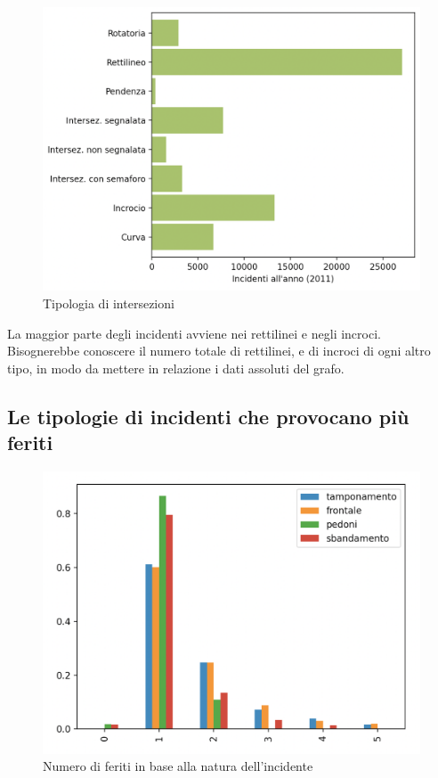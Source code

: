 \documentclass[a4paper]{report}
\begin{document}
\begin{figure}
    \includegraphics[width=\linewidth]{../src/incidenti/incidenti_senza_coords/localizzazione_incidente/intersezioni.png}
    \caption{Tipologia di intersezioni}
    \label{fig:tipo_intersezioni}
\end{figure}

La maggior parte degli incidenti avviene nei rettilinei e negli incroci.\\
Bisognerebbe conoscere il numero totale di rettilinei, e di incroci di ogni altro tipo, in 
modo da mettere in relazione i dati assoluti del grafo.


\subsection{Le tipologie di incidenti che provocano più feriti}

\begin{figure}
    \includegraphics[width=\linewidth]{../src/incidenti/incidenti_senza_coords/natura_incidente/numero_feriti.png}
    \caption{Numero di feriti in base alla natura dell'incidente}
    \label{fig:numero_feriti}
\end{figure}
\end{document}
